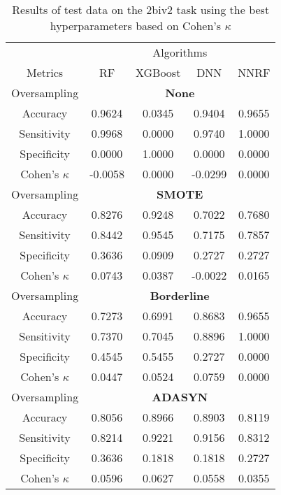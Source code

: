 \begin{table}[!htb]
\centering
\caption{Results of test data on the 2biv2 task using the best hyperparameters based on Cohen's $\kappa$}
\label{tab:2biv2_test_results}
\begin{tabular}{c | c c c c}
\hline
 & \multicolumn{4}{c}{Algorithms}\\ 
Metrics &RF & XGBoost & DNN & NNRF\\ 
\hline
Oversampling &\multicolumn{4}{|c}{\textbf{None}}\\ 
\hline
Accuracy & 0.9624 & 0.0345 & 0.9404 & 0.9655\\ 
Sensitivity & 0.9968 & 0.0000 & 0.9740 & 1.0000\\ 
Specificity & 0.0000 & 1.0000 & 0.0000 & 0.0000\\ 
Cohen's $\kappa$ & -0.0058 & 0.0000 & -0.0299 & 0.0000\\ 
\hline
Oversampling &\multicolumn{4}{|c}{\textbf{SMOTE}}\\ 
\hline
Accuracy & 0.8276 & 0.9248 & 0.7022 & 0.7680\\ 
Sensitivity & 0.8442 & 0.9545 & 0.7175 & 0.7857\\ 
Specificity & 0.3636 & 0.0909 & 0.2727 & 0.2727\\ 
Cohen's $\kappa$ & 0.0743 & 0.0387 & -0.0022 & 0.0165\\ 
\hline
Oversampling &\multicolumn{4}{|c}{\textbf{Borderline}}\\ 
\hline
Accuracy & 0.7273 & 0.6991 & 0.8683 & 0.9655\\ 
Sensitivity & 0.7370 & 0.7045 & 0.8896 & 1.0000\\ 
Specificity & 0.4545 & 0.5455 & 0.2727 & 0.0000\\ 
Cohen's $\kappa$ & 0.0447 & 0.0524 & 0.0759 & 0.0000\\ 
\hline
Oversampling &\multicolumn{4}{|c}{\textbf{ADASYN}}\\ 
\hline
Accuracy & 0.8056 & 0.8966 & 0.8903 & 0.8119\\ 
Sensitivity & 0.8214 & 0.9221 & 0.9156 & 0.8312\\ 
Specificity & 0.3636 & 0.1818 & 0.1818 & 0.2727\\ 
Cohen's $\kappa$ & 0.0596 & 0.0627 & 0.0558 & 0.0355\\ 
\hline
\end{tabular}
\end{table}


